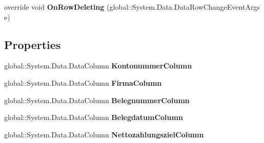 \begin{DoxyCompactItemize}
\item 
override void {\bfseries On\+Row\+Deleting} (global\+::\+System.\+Data.\+Data\+Row\+Change\+Event\+Args e)\hypertarget{class_products_1_1_data_1_1ds_sage_1_1_offene_posten_data_table_a2cb40ff2ed5f4449241435cbd3df0efa}{}\label{class_products_1_1_data_1_1ds_sage_1_1_offene_posten_data_table_a2cb40ff2ed5f4449241435cbd3df0efa}

\end{DoxyCompactItemize}
\subsection*{Properties}
\begin{DoxyCompactItemize}
\item 
global\+::\+System.\+Data.\+Data\+Column {\bfseries Kontonummer\+Column}\hypertarget{class_products_1_1_data_1_1ds_sage_1_1_offene_posten_data_table_afbe39378e10aaedf8263ebf56e483bc2}{}\label{class_products_1_1_data_1_1ds_sage_1_1_offene_posten_data_table_afbe39378e10aaedf8263ebf56e483bc2}

\item 
global\+::\+System.\+Data.\+Data\+Column {\bfseries Firma\+Column}\hypertarget{class_products_1_1_data_1_1ds_sage_1_1_offene_posten_data_table_a4eb56bc80fb61c07fca2a2e9d87fe69b}{}\label{class_products_1_1_data_1_1ds_sage_1_1_offene_posten_data_table_a4eb56bc80fb61c07fca2a2e9d87fe69b}

\item 
global\+::\+System.\+Data.\+Data\+Column {\bfseries Belegnummer\+Column}\hypertarget{class_products_1_1_data_1_1ds_sage_1_1_offene_posten_data_table_a6729cd51ce051fcf4407ba56d19b1014}{}\label{class_products_1_1_data_1_1ds_sage_1_1_offene_posten_data_table_a6729cd51ce051fcf4407ba56d19b1014}

\item 
global\+::\+System.\+Data.\+Data\+Column {\bfseries Belegdatum\+Column}\hypertarget{class_products_1_1_data_1_1ds_sage_1_1_offene_posten_data_table_ab9b4f6a347377497d35dd3d9f5e6d42c}{}\label{class_products_1_1_data_1_1ds_sage_1_1_offene_posten_data_table_ab9b4f6a347377497d35dd3d9f5e6d42c}

\item 
global\+::\+System.\+Data.\+Data\+Column {\bfseries Nettozahlungsziel\+Column}\hypertarget{class_products_1_1_data_1_1ds_sage_1_1_offene_posten_data_table_a8f92160b131aaf3e3af550a3c72f42f2}{}\label{class_products_1_1_data_1_1ds_sage_1_1_offene_posten_data_table_a8f92160b131aaf3e3af550a3c72f42f2}


\end{DoxyCompactItemize}
